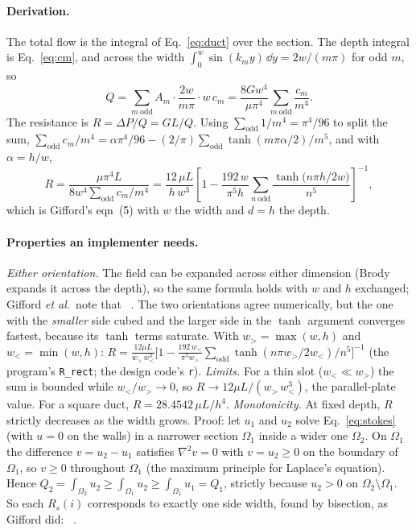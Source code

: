 \paragraph{Derivation.} The total flow is the integral of Eq.~\eqref{eq:duct} over the section.
The depth integral is Eq.~\eqref{eq:cm}, and across the width
$\int_0^w\sin(k_my)\,\dd y=2w/(m\pi)$ for odd $m$, so
\begin{equation}
Q=\sum_{m\ \text{odd}}A_m\cdot\frac{2w}{m\pi}\cdot w\,c_m=\frac{8Gw^4}{\mu\pi^4}\sum_{m\ \text{odd}}\frac{c_m}{m^4}.
\end{equation}
The resistance is $R=\Delta P/Q=GL/Q$. Using $\sum_{\text{odd}}1/m^4=\pi^4/96$ to split the sum,
$\sum_{\text{odd}}c_m/m^4=\alpha\pi^4/96-(2/\pi)\sum_{\text{odd}}\tanh(m\pi\alpha/2)/m^5$, and with
$\alpha=h/w$,
\begin{equation}
R=\frac{\mu\pi^4L}{8w^4\sum_{\text{odd}}c_m/m^4}
=\frac{12\,\mu L}{h\,w^3}\left[1-\frac{192\,w}{\pi^5h}\sum_{n\ \text{odd}}\frac{\tanh\!\big(n\pi h/2w\big)}{n^5}\right]^{-1},
\label{eq:Rrect}
\end{equation}
which is Gifford's eqn~(5) with $w$ the width and $d=h$ the depth.

\paragraph{Properties an implementer needs.}
\emph{Either orientation.} The field can be expanded across either dimension (Brody expands it
across the depth), so the same formula holds with $w$ and $h$ exchanged; Gifford \emph{et al.}\
note that ~\cite[p.~4499]{b1}.
The two orientations agree numerically, but the one with the \emph{smaller} side cubed and the
larger side in the $\tanh$ argument converges fastest, because its $\tanh$ terms saturate. With
$w_>=\max(w,h)$ and $w_<=\min(w,h)$:
$R=\frac{12\mu L}{w_>\,w_<^3}\big[1-\frac{192\,w_<}{\pi^5w_>}\sum_{\text{odd}}\tanh(n\pi w_>/2w_<)/n^5\big]^{-1}$
(the program's \texttt{R\_rect}; the design code's \texttt{r}).
\emph{Limits.} For a thin slot ($w_<\ll w_>$) the sum is bounded while $w_</w_>\to0$, so
$R\to12\mu L/(w_>\,w_<^3)$, the parallel-plate value. For a square duct, $R=28.4542\,\mu L/h^4$.
\emph{Monotonicity.} At fixed depth, $R$ strictly decreases as the width grows. Proof: let
$u_1$ and $u_2$ solve Eq.~\eqref{eq:stokes} (with $u=0$ on the walls) in a narrower section
$\Omega_1$ inside a wider one $\Omega_2$. On $\Omega_1$ the difference $v=u_2-u_1$ satisfies
$\nabla^2v=0$ with $v=u_2\ge0$ on the boundary of $\Omega_1$, so $v\ge0$ throughout $\Omega_1$ (the
maximum principle for Laplace's equation). Hence
$Q_2=\int_{\Omega_2}u_2\ge\int_{\Omega_1}u_2\ge\int_{\Omega_1}u_1=Q_1$, strictly because $u_2>0$ on
$\Omega_2\setminus\Omega_1$. So each $R_s(i)$ corresponds to exactly one side width,
found by bisection, as Gifford did: ~\cite[p.~4498]{b1}.

